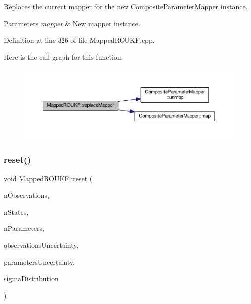 Replaces the current {\ttfamily mapper} for the new \mbox{\hyperlink{classCompositeParameterMapper}{Composite\+Parameter\+Mapper}} instance. 
\begin{DoxyParams}{Parameters}
{\em mapper} & New mapper instance. \\
\hline
\end{DoxyParams}


Definition at line 326 of file Mapped\+R\+O\+U\+K\+F.\+cpp.

Here is the call graph for this function\+:\nopagebreak
\begin{figure}[H]
\begin{center}
\leavevmode
\includegraphics[width=350pt]{classMappedROUKF_ad84ef097844217e5c5342e2ee8968521_cgraph}
\end{center}
\end{figure}
\mbox{\label{classMappedROUKF_ad4ddf881c1ade83fe0cc2ab99ad58b7e}} 
\subsubsection{\texorpdfstring{reset()}{reset()}}
{\footnotesize\ttfamily void Mapped\+R\+O\+U\+K\+F\+::reset (\begin{DoxyParamCaption}\item[{int}]{n\+Observations,  }\item[{int}]{n\+States,  }\item[{int}]{n\+Parameters,  }\item[{vector$<$ double $>$}]{observations\+Uncertainty,  }\item[{vector$<$ double $>$}]{parameters\+Uncertainty,  }\item[{\mbox{\hyperlink{classSigmaPointsGenerator_ad6f9474c0313425a10add120e0acf944}{Sigma\+Points\+Generator\+::\+S\+I\+G\+M\+A\+\_\+\+D\+I\+S\+T\+R\+I\+B\+U\+T\+I\+ON}}}]{sigma\+Distribution }\end{DoxyParamCaption})}

